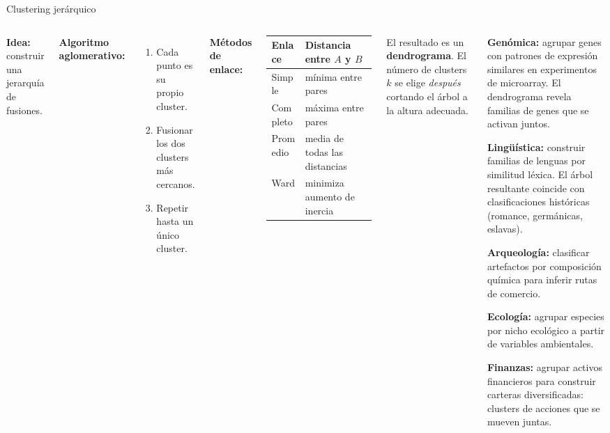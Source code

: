 \documentclass[aspectratio=169]{beamer}
\begin{document}
\begin{frame}{Clustering jerárquico}
\begin{columns}[T]
\textbf{Idea:} construir una jerarquía de fusiones.

\medskip
\textbf{Algoritmo aglomerativo:}
\begin{enumerate}
  \item Cada punto es su propio cluster.
  \item Fusionar los dos clusters más cercanos.
  \item Repetir hasta un único cluster.
\end{enumerate}

\medskip
\textbf{Métodos de enlace:}

{\small
\begin{tabular}{ll}
\toprule
\textbf{Enlace} & \textbf{Distancia entre $A$ y $B$} \\
\midrule
Simple   & mínima entre pares \\
Completo & máxima entre pares \\
Promedio & media de todas las distancias \\
Ward     & minimiza aumento de inercia \\
\bottomrule
\end{tabular}
}

\medskip
\begin{concepto}
El resultado es un \textbf{dendrograma}. El número de clusters $k$ se elige \emph{después} cortando el árbol a la altura adecuada.
\end{concepto}

\begin{aplicacion}
\textbf{Genómica:} agrupar genes con patrones de expresión similares en experimentos de microarray. El dendrograma revela familias de genes que se activan juntos.

\medskip
\textbf{Lingüística:} construir familias de lenguas por similitud léxica. El árbol resultante coincide con clasificaciones históricas (romance, germánicas, eslavas).

\medskip
\textbf{Arqueología:} clasificar artefactos por composición química para inferir rutas de comercio.

\medskip
\textbf{Ecología:} agrupar especies por nicho ecológico a partir de variables ambientales.

\medskip
\textbf{Finanzas:} agrupar activos financieros para construir carteras diversificadas: clusters de acciones que se mueven juntas.
\end{aplicacion}
\end{columns}
\end{frame}
\end{document}
